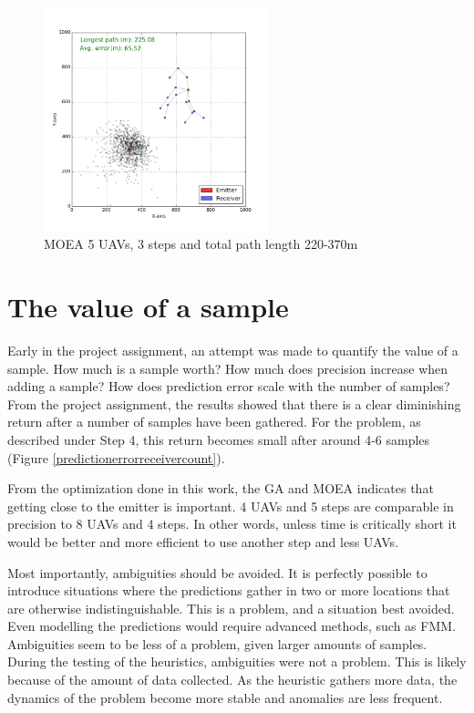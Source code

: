 \documentclass[10pt,a4paper]{book}
\begin{document}
\begin{figure}[H]
\begin{minipage}{60mm}
  \centering
\includegraphics[width=65mm]{stepmoea_5uavs_3steps/Pareto_25.png}
\end{minipage}
\caption{\Gls{MOEA} 5 \glspl{UAV}, 3 steps and total path length 220-370m}
\label{MOEA_STEPDEV}
\end{figure}






\newpage

\section{The value of a sample}
\label{RA_WORTH}



Early in the project assignment, an attempt was made to quantify the value of a sample. How much is a sample worth? How much does precision increase when adding a sample? How does prediction error scale with the number of samples? From the project assignment, the results showed that there is a clear diminishing return after a number of samples have been gathered. For the problem, as described under Step 4, this return becomes small after around 4-6 samples (Figure \ref{predictionerrorreceivercount}).

From the optimization done in this work, the \gls{GA} and \gls{MOEA} indicates that getting close to the emitter is important. 4 \glspl{UAV} and 5 steps are comparable in precision to 8 \glspl{UAV} and 4 steps. In other words, unless time is critically short it would be better and more efficient to use another step and less \glspl{UAV}.

Most importantly, ambiguities should be avoided. It is perfectly possible to introduce situations where the predictions gather in two or more locations that are otherwise indistinguishable. This is a problem, and a situation best avoided. Even modelling the predictions would require advanced methods, such as \gls{FMM}. Ambiguities seem to be less of a problem, given larger amounts of samples. During the testing of the heuristics, ambiguities were not a problem. This is likely because of the amount of data collected. As the heuristic gathers more data, the dynamics of the problem become more stable and anomalies are less frequent.
\end{document}
